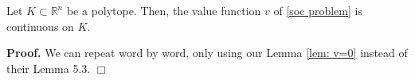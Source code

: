 \documentclass[11pt]{amsart}
\numberwithin{equation}{section}
\newcommand{\rr}{\mathbb{R}}
\newcommand{\ep}{\hfill $\Box$}
\begin{document}
\begin{prop}
Let $K\subset\rr^n$ be a polytope. Then, the value function $v$ of \eqref{soc problem} is continuous on $K$.
\end{prop}

\noindent\textbf{Proof.} We can repeat \cite[proof of Corollary 5.9(iii)]{larsson_minimum_2022} word by word, only using our Lemma \ref{lem: v=0} instead of their Lemma 5.3. \ep

%
%
\end{document}
